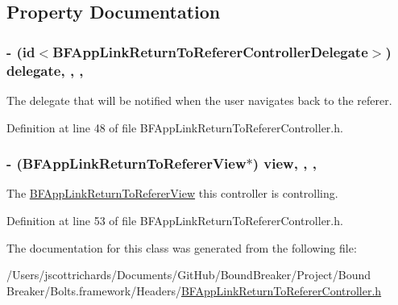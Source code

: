 \subsection{Property Documentation}
\hypertarget{interface_b_f_app_link_return_to_referer_controller_a314cd7219fab9e64981a67e3bf99c6d6}{}
\subsubsection[{delegate}]{\setlength{\rightskip}{0pt plus 5cm}-\/ (id$<${\bf B\+F\+App\+Link\+Return\+To\+Referer\+Controller\+Delegate}$>$) delegate\hspace{0.3cm}{\ttfamily [read]}, {\ttfamily [write]}, {\ttfamily [nonatomic]}, {\ttfamily [weak]}}\label{interface_b_f_app_link_return_to_referer_controller_a314cd7219fab9e64981a67e3bf99c6d6}
The delegate that will be notified when the user navigates back to the referer. 

Definition at line 48 of file B\+F\+App\+Link\+Return\+To\+Referer\+Controller.\+h.

\hypertarget{interface_b_f_app_link_return_to_referer_controller_af28b223c0c9a782847fdf45e934a2009}{}
\subsubsection[{view}]{\setlength{\rightskip}{0pt plus 5cm}-\/ ({\bf B\+F\+App\+Link\+Return\+To\+Referer\+View}$\ast$) view\hspace{0.3cm}{\ttfamily [read]}, {\ttfamily [write]}, {\ttfamily [nonatomic]}, {\ttfamily [strong]}}\label{interface_b_f_app_link_return_to_referer_controller_af28b223c0c9a782847fdf45e934a2009}
The \hyperlink{interface_b_f_app_link_return_to_referer_view}{B\+F\+App\+Link\+Return\+To\+Referer\+View} this controller is controlling. 

Definition at line 53 of file B\+F\+App\+Link\+Return\+To\+Referer\+Controller.\+h.



The documentation for this class was generated from the following file\+:\begin{DoxyCompactItemize}
\item 
/\+Users/jscottrichards/\+Documents/\+Git\+Hub/\+Bound\+Breaker/\+Project/\+Bound Breaker/\+Bolts.\+framework/\+Headers/\hyperlink{_b_f_app_link_return_to_referer_controller_8h}{B\+F\+App\+Link\+Return\+To\+Referer\+Controller.\+h}\end{DoxyCompactItemize}
